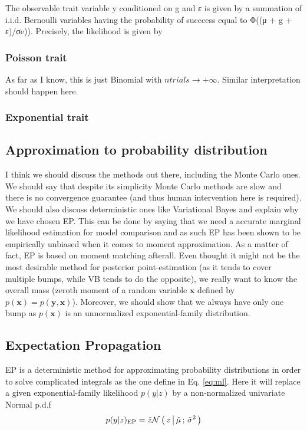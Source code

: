 The observable trait variable y conditioned on g and ε is given by a summation
of i.i.d. Bernoulli variables having the probability of succcess equal to Φ((μ +
g + ε)/σe)). Precisely, the likelihood is given by

\subsubsection{Poisson trait}

As far as I know, this is just Binomial with $ntrials \rightarrow +\infty$.
Similar interpretation should happen here.

\subsubsection{Exponential trait}



\subsection{Approximation to probability distribution}

I think we should discuss the methods out there, including the Monte Carlo ones.
We should say that despite its simplicity Monte Carlo methods are slow and there
is no convergence guarantee (and thus human intervention here is required). We
should also discuss deterministic ones like Variational Bayes and explain why we
have chosen EP. This can be done by saying that we need a accurate marginal
likelihood estimation for model comparison and as such EP has been shown to be
empirically unbiased when it comes to moment approximation. As a matter of fact,
EP is based on moment matching afterall. Even thought it might not be the most
desirable method for posterior point-estimation (as it tends to cover multiple
bumps, while VB tends to do the opposite), we really want to know the overall
mass (zeroth moment of a random variable $\mathbf x$ defined by $p(\mathbf x) =
p(\mathbf y, \mathbf x)$). Moreover, we should show that we always have only one
bump as $p(\mathbf x)$ is an unnormalized exponential-family distribution.

\subsection{Expectation Propagation}

EP is a deterministic method for approximating probability distributions in
order to solve complicated integrals as the one define in Eq. \eqref{eq:ml}.
Here it will replace a given exponential-family likelihood $p(y|z)$ by a
non-normalized univariate Normal p.d.f
\begin{align*}
  p(y|z)_{\text{EP}} = \tilde z \mathcal{N}\left(\, { {z} \, \big| \, {\tilde \mu} } \,;\, { {\tilde \sigma^2} } \,\right)
\end{align*}

